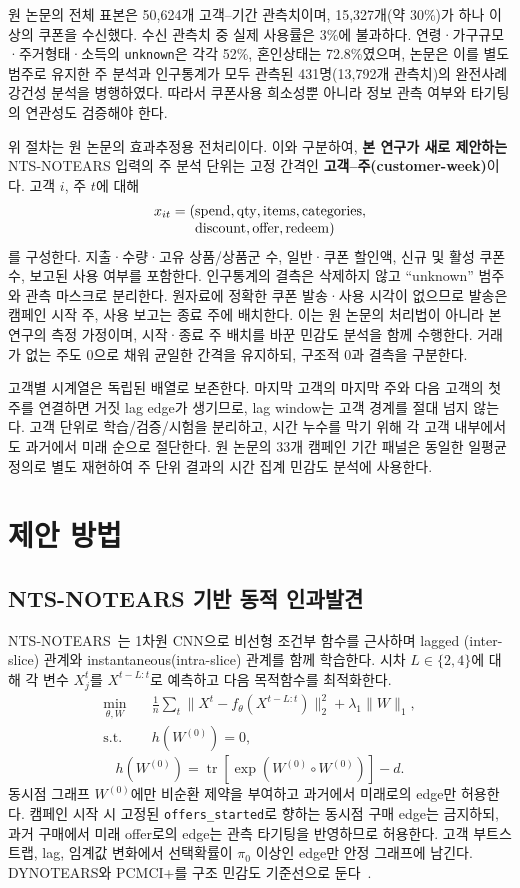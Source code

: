 \documentclass[11pt,twocolumn]{article}
\begin{document}
원 논문의 전체 표본은 50,624개 고객--기간 관측치이며, 15,327개(약 30\%)가 하나 이상의
쿠폰을 수신했다. 수신 관측치 중 실제 사용률은 3\%에 불과하다. 연령·가구규모·주거형태·소득의
\texttt{unknown}은 각각 52\%, 혼인상태는 72.8\%였으며, 논문은 이를 별도 범주로 유지한 주 분석과
인구통계가 모두 관측된 431명(13,792개 관측치)의 완전사례 강건성 분석을 병행하였다. 따라서
쿠폰사용 희소성뿐 아니라 정보 관측 여부와 타기팅의 연관성도 검증해야 한다.

위 절차는 원 논문의 효과추정용 전처리이다. 이와 구분하여, \textbf{본 연구가 새로 제안하는}
NTS-NOTEARS 입력의 주 분석 단위는 고정 간격인 \textbf{고객--주(customer-week)}이다.
고객 $i$, 주 $t$에 대해
\[
\begin{aligned}
x_{it}=(&{\rm spend,qty,items,categories},\\[-1mm]
        &{\rm discount,offer,redeem})
\end{aligned}
\]
를 구성한다. 지출·수량·고유 상품/상품군 수, 일반·쿠폰 할인액, 신규 및 활성 쿠폰 수,
보고된 사용 여부를 포함한다. 인구통계의 결측은 삭제하지 않고 ``unknown'' 범주와 관측 마스크로
분리한다. 원자료에 정확한 쿠폰 발송·사용 시각이 없으므로 발송은 캠페인 시작 주, 사용 보고는
종료 주에 배치한다. 이는 원 논문의 처리법이 아니라 본 연구의 측정 가정이며, 시작·종료 주
배치를 바꾼 민감도 분석을 함께 수행한다. 거래가 없는 주도 0으로 채워 균일한 간격을 유지하되,
구조적 0과 결측을 구분한다.

고객별 시계열은 독립된 배열로 보존한다. 마지막 고객의 마지막 주와 다음 고객의 첫 주를
연결하면 거짓 lag edge가 생기므로, lag window는 고객 경계를 절대 넘지 않는다. 고객 단위로
학습/검증/시험을 분리하고, 시간 누수를 막기 위해 각 고객 내부에서도 과거에서 미래 순으로
절단한다. 원 논문의 33개 캠페인 기간 패널은 동일한 일평균 정의로 별도 재현하여 주 단위 결과의
시간 집계 민감도 분석에 사용한다.

\section{제안 방법}
\subsection{NTS-NOTEARS 기반 동적 인과발견}
NTS-NOTEARS~\cite{sun2023}는 1차원 CNN으로 비선형 조건부 함수를 근사하며 lagged
(inter-slice) 관계와 instantaneous(intra-slice) 관계를 함께 학습한다. 시차 $L\in\{2,4\}$에
대해 각 변수 $X_j^t$를 $X^{t-L:t}$로 예측하고 다음 목적함수를 최적화한다.
\begin{align*}
\min_{\theta,W}\quad &\frac{1}{n}\sum_t\|X^t-f_\theta(X^{t-L:t})\|_2^2
+\lambda_1\|W\|_1,\\[-1mm]
\text{s.t.}\quad &h(W^{(0)})=0,
\end{align*}
\[
h(W^{(0)})=\operatorname{tr}\!\left[\exp(W^{(0)}\circ W^{(0)})\right]-d.
\]
동시점 그래프 $W^{(0)}$에만 비순환 제약을 부여하고 과거에서 미래로의 edge만 허용한다.
캠페인 시작 시 고정된 \texttt{offers\_started}로 향하는 동시점 구매 edge는 금지하되, 과거
구매에서 미래 offer로의 edge는 관측 타기팅을 반영하므로 허용한다. 고객 부트스트랩, lag,
임계값 변화에서 선택확률이 $\pi_0$ 이상인 edge만 안정 그래프에 남긴다. DYNOTEARS와
PCMCI+를 구조 민감도 기준선으로 둔다~\cite{pamfil2020,runge2019}.
\end{document}
